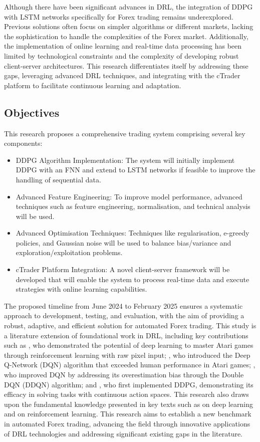 Although there have been significant advances in DRL, the integration of DDPG with LSTM networks specifically for Forex trading remains underexplored. Previous solutions often focus on simpler algorithms or different markets, lacking the sophistication to handle the complexities of the Forex market. Additionally, the implementation of online learning and real-time data processing has been limited by technological constraints and the complexity of developing robust client-server architectures. This research differentiates itself by addressing these gaps, leveraging advanced DRL techniques, and integrating with the cTrader platform to facilitate continuous learning and adaptation.

\subsection{Objectives}

This research proposes a comprehensive trading system comprising several key components:
\begin{itemize}
\item DDPG Algorithm Implementation: The system will initially implement DDPG with an FNN and extend to LSTM networks if feasible to improve the handling of sequential data.
\item Advanced Feature Engineering: To improve model performance, advanced techniques such as feature engineering, normalisation, and technical analysis will be used.
\item Advanced Optimisation Techniques: Techniques like regularisation, e-greedy policies, and Gaussian noise will be used to balance bias/variance and exploration/exploitation problems.
\item cTrader Platform Integration: A novel client-server framework will be developed that will enable the system to process real-time data and execute strategies with online learning capabilities.
\end{itemize}

The proposed timeline from June 2024 to February 2025 ensures a systematic approach to development, testing, and evaluation, with the aim of providing a robust, adaptive, and efficient solution for automated Forex trading. This study is a literature extension of foundational work in DRL, including key contributions such as \cite{mnih_playing_2013}, who demonstrated the potential of deep learning to master Atari games through reinforcement learning with raw pixel input; \cite{mnih_human-level_2015}, who introduced the Deep Q-Network (DQN) algorithm that exceeded human performance in Atari games; \cite{van_hasselt_deep_2016}, who improved DQN by addressing its overestimation bias through the Double DQN (DDQN) algorithm; and \cite{lillicrap_continuous_2015}, who first implemented DDPG, demonstrating its efficacy in solving tasks with continuous action spaces. This research also draws upon the fundamental knowledge presented in key texts such as \cite{goodfellow_deep_2016} on deep learning and \cite{sutton_reinforcement_2018} on reinforcement learning. This research aims to establish a new benchmark in automated Forex trading, advancing the field through innovative applications of DRL technologies and addressing significant existing gaps in the literature.
